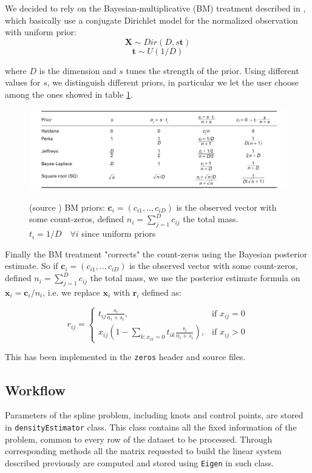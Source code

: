 We decided to rely on the Bayesian-multiplicative (BM) treatment described in \cite{fernandez:zeros}, which basically use a conjugate Dirichlet model for the normalized observation with uniform prior:
\[ \bm{X} \sim Dir(D,s\bm{t}) \]
\[ \bm{t} \sim U(1/D) \]

where $D$ is the dimension and $s$ tunes the strength of the prior. Using different values for $s$, we distinguish different priors, in particular we let the user choose among the ones showed in table \ref{fig:priors}.

\begin{figure}[ht]
	
	
	\includegraphics[width=\textwidth]{./pictures/BM/BMpriors.png}
	\label{fig:priors}
	
	\caption{(source \cite{fernandez:zeros}) BM priors: $\bm{c}_{i}=(c_{i1},..,c_{iD})$ is the observed vector with some count-zeros, defined $n_{i}=\sum_{j=1}^{D}c_{ij}$ the total mass. $t_{i}=1/D \quad \forall i$ since uniform priors}
	\label{fig:priors}
	
\end{figure}

Finally the BM treatment "corrects" the count-zeros using the Bayesian posterior estimate. So if $\bm{c}_{i}=(c_{i1},..,c_{iD})$ is the observed vector with some count-zeros, defined $n_{i}=\sum_{j=1}^{D}c_{ij}$ the total mass, we use the posterior estimate formula on $\bm{x}_{i}=\bm{c}_{i}/n_{i}$, i.e. we replace $\bm{x}_{i}$ with $\bm{r}_{i}$ defined as:

\[ r_{ij} = \begin{cases} t_{ij}\frac{s_{i}}{n_{i}+s_{i}}, & \mbox{if } x_{ij}=0 \\ x_{ij}(1-\sum_{k:x_{ik}=0}t_{ik}\frac{s_{i}}{n_{i}+s_{i}}), & \mbox{if } x_{ij}>0 \end{cases} \]

This has been implemented in the \verb|zeros| header and source files.

\subsection{Workflow} \label{workflow}
Parameters of the spline problem, including knots and control points, are stored in \verb|densityEstimator| class. This class contains all the fixed information of the problem, common to every row of the dataset to be processed. Through corresponding methods all the matrix requested to build the linear system described previously are computed and stored using \verb|Eigen| in such class.

